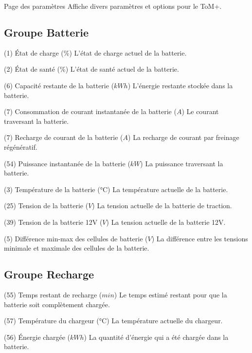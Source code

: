 {Page des paramètres}
{Affiche divers paramètres et options pour le ToM+.}

\subsection{Groupe Batterie}
\label{sec:item_numbers}

{(1) État de charge (\%)}
{L'état de charge actuel de la batterie.}

{(2) État de santé (\%)}
{L'état de santé actuel de la batterie.}

{(6) Capacité restante de la batterie (\(kWh\))}
{L'énergie restante stockée dans la batterie.}

{(7) Consommation de courant instantanée de la batterie (\(A\))}
{Le courant traversant la batterie.}

{(7) Recharge de courant de la batterie (\(A\))}
{La recharge de courant par freinage régénératif.}

{(54) Puissance instantanée de la batterie (\(kW\))}
{La puissance traversant la batterie.}

{(3) Température de la batterie (°C)}
{La température actuelle de la batterie.}

{(25) Tension de la batterie (\(V\))}
{La tension actuelle de la batterie de traction.}

{(39) Tension de la batterie 12V (\(V\))}
{La tension actuelle de la batterie 12V.}

{(5) Différence min-max des cellules de batterie (\(V\))}
{La différence entre les tensions minimale et maximale des cellules de la batterie.}

\subsection{Groupe Recharge}

{(55) Temps restant de recharge (\(min\))}
{Le temps estimé restant pour que la batterie soit complètement chargée.}

{(57) Température du chargeur (°C)}
{La température actuelle du chargeur.}

{(56) Énergie chargée (\(kWh\))}
{La quantité d'énergie qui a été chargée dans la batterie.}

